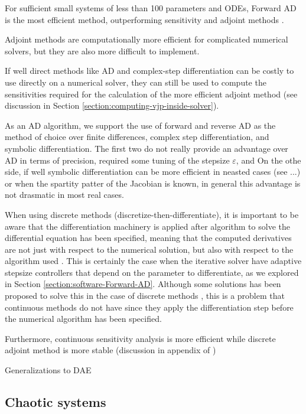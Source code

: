 For sufficient small systems of less than 100 parameters and ODEs, Forward AD is the most efficient method, outperforming sensitivity and adjoint methods \cite{ma2021comparison}.

Adjoint methods are computationally more efficient for complicated numerical solvers, but they are also more difficult to implement.

If well direct methods like AD and complex-step differentiation can be costly to use directly on a numerical solver, they can still be used to compute the sensitivities required for the calculation of the more efficient adjoint method (see discussion in Section \ref{section:computing-vjp-inside-solver}). 

As an AD algorithm, we support the use of forward and reverse AD as the method of choice over finite differences, complex step differentiation, and symbolic differentiation. 
The first two do not really provide an advantage over AD in terms of precision, required some tuning of the stepsize $\varepsilon$, and 
On the othe side, if well symbolic differentiation can be more efficient in neasted cases (see ...) or when the spartity patter of the Jacobian is known, in general this advantage is not drasmatic in most real cases. 

When using discrete methods (discretize-then-differentiate), it is important to be aware that the differentiation machinery is applied after algorithm to solve the differential equation has been specified, meaning that the computed derivatives are not just with respect to the numerical solution, but also with respect to the algorithm used \cite{Eberhard_Bischof_1996}.
This is certainly the case when the iterative solver have adaptive stepsize controllers that depend on the parameter to differentiate, as we explored in Section \ref{section:software-Forward-AD}.
Although some solutions has been proposed to solve this in the case of discrete methods \cite{Eberhard_Bischof_1996}, this is a problem that continuous methods do not have since they apply the differentiation step before the numerical algorithm has been specified. 

Furthermore, continuous sensitivity analysis is more efficient while discrete adjoint method is more stable (discussion in appendix of \cite{rackauckas2020universal})

Generalizations to DAE \cite{Cao_Li_Petzold_2002}

\subsection{Chaotic systems}

